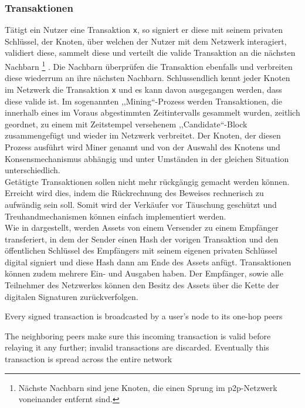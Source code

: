     \subsubsection{Transaktionen}
    \label{sec:sota_blockchain_trx}
    Tätigt ein Nutzer eine Transaktion \lstinline{x}, so signiert er diese mit seinem privaten Schlüssel, der Knoten, über welchen der Nutzer mit dem Netzwerk interagiert, validiert diese, sammelt diese und verteilt die valide Transaktion an die nächsten Nachbarn
    \!\footnote{Nächste Nachbarn sind jene Knoten, die einen Sprung im \gls{p2p}-Netzwerk voneinander entfernt sind.}
    .
    Die Nachbarn überprüfen die Transaktion ebenfalls und verbreiten diese wiederrum an ihre nächsten Nachbarn. 
    Schlussendlich kennt jeder Knoten im Netzwerk die Transaktion \lstinline{x} und es kann davon ausgegangen werden, dass diese valide ist. 
    Im sogenannten ,,Mining``-Prozess werden Transaktionen, die innerhalb eines im Voraus abgestimmten Zeitintervalls gesammelt wurden, zeitlich geordnet, zu einem mit Zeitstempel versehenem ,,Candidate``-Block zusammengefügt und wieder im Netzwerk verbreitet. 
    Der Knoten, der diesen Prozess ausführt wird Miner genannt und von der Auswahl des Knotens und Konsensmechanismus abhängig und unter Umständen in der gleichen Situation unterschiedlich.\cite{Christidis2016}
    \medskip\\
    Getätigte Transaktionen sollen nicht mehr rückgängig gemacht werden können.
    Erreicht wird dies, indem die Rückrechnung des Beweises rechnerisch zu aufwändig sein soll\cite{Nakamoto2008}.
    Somit wird der Verkäufer vor Täuschung geschützt und Treuhandmechanismen können einfach implementiert werden\cite{Nakamoto2008}.  
    \medskip\\
    Wie in  dargestellt, werden Assets von einem Versender zu einem Empfänger transferiert, in dem der Sender einen Hash der vorigen Transaktion und den öffentlichen Schlüssel des Empfängers mit seinem eigenen privaten Schlüssel digital signiert und diese Hash dann am Ende des Assets anfügt.
    Transaktionen können zudem mehrere Ein- und Ausgaben haben\cite{Nakamoto2008}.
    Der Empfänger, sowie alle Teilnehmer des Netzwerkes können den Besitz des Assets über die Kette der digitalen Signaturen zurückverfolgen\cite{Nakamoto2008}.
    
    Every signed transaction is broadcasted by a user’s node to its one-hop peers\cite{Christidis2016}
    
    The neighboring peers make sure this incoming transaction is valid before relaying it any further; invalid transactions are discarded. Eventually this transaction is spread across the entire network\cite{Christidis2016}
    
